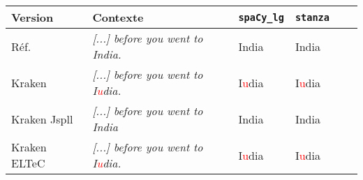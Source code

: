 \begin{tabular}{|l|l|l|l|l|l|}

\hline

\bf{Version} & \bf {Contexte} & \bf{\texttt{spaCy\_lg}}&\bf{\texttt{stanza}}\\
\hline 
Réf.\ &\textit{[...] before you went to India.} &India &India \\
 Kraken &\textit{[...] before you went to I\textcolor{red}{u}dia.}&I\textcolor{red}{u}dia&I\textcolor{red}{u}dia\\ 
 Kraken Jspll &\textit{[...] before you went to India}&India &India\\ 
 Kraken ELTeC &\textit{[...] before you went to I\textcolor{red}{u}dia.}&I\textcolor{red}{u}dia&I\textcolor{red}{u}dia\\ 

\hline
\end{tabular}
